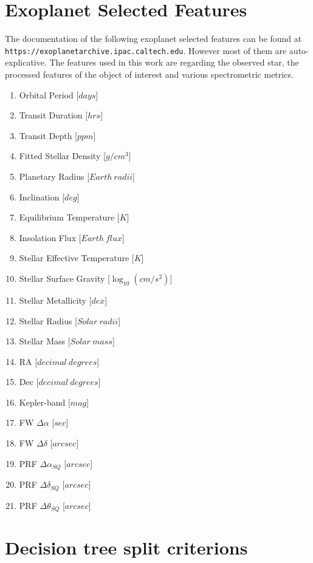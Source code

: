 \documentclass[11pt, a4paper]{article}
\begin{document}
\section{Exoplanet Selected Features}
  The documentation of the following exoplanet selected features can be found at \texttt{https://exoplanetarchive.ipac.caltech.edu}.
  However most of them are auto-explicative.
  The features used in this work are regarding the observed star, the processed features of the object of interest and various spectrometric metrics.
  \begin{multicols}{2}
    \label{appendix:features}
    \begin{enumerate}
      \item Orbital Period [$days$]
      \item Transit Duration [$hrs$]
      \item Transit Depth [$ppm$]
      \item Fitted Stellar Density [$g/cm^{3}$]
      \item Planetary Radius [$Earth\:radii$]
      \item Inclination [$deg$]
      \item Equilibrium Temperature [$K$]
      \item Insolation Flux [$Earth\:flux$]
      \item Stellar Effective Temperature [$K$]
      \item Stellar Surface Gravity [$\log_{10}(cm/s^{2})$]
      \item Stellar Metallicity [$dex$]
      \item Stellar Radius [$Solar\:radii$]
      \item Stellar Mass [$Solar\:mass$]
      \item RA [$decimal\:degrees$]
      \item Dec [$decimal\:degrees$]
      \item Kepler-band [$mag$]
      \item FW $\Delta\alpha$ [$sec$]
      \item FW $\Delta\delta$ [$arcsec$]
      \item PRF $\Delta\alpha_{SQ}$ [$arcsec$]
      \item PRF $\Delta\delta_{SQ}$ [$arcsec$]
      \item PRF $\Delta\theta_{SQ}$ [$arcsec$]
    \end{enumerate}
  \end{multicols}

\section{Decision tree split criterions}
  \label{appendix:splitcriterions}
\end{document}
